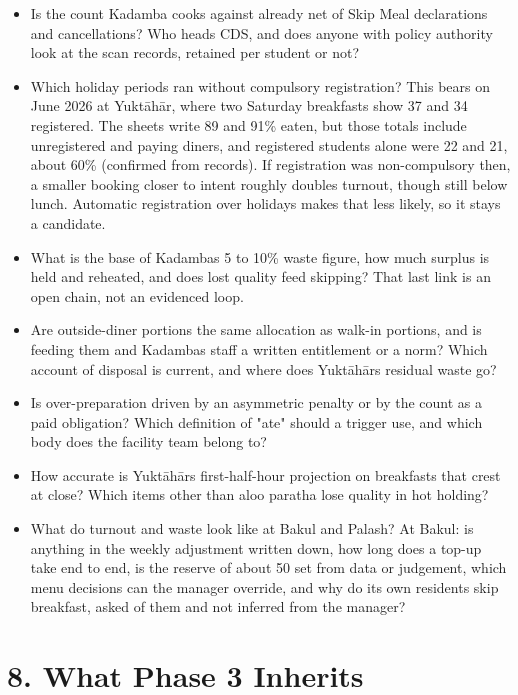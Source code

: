 \documentclass[
  10pt,
  table]{article}
\providecommand{\tightlist}{%
  \setlength{\itemsep}{0pt}\setlength{\parskip}{0pt}}
\renewcommand{\tightlist}{\setlength{\itemsep}{1.5pt}\setlength{\parskip}{0pt}}
\begin{document}
\begin{itemize}
\tightlist
\item
  Is the count Kadamba cooks against already net of Skip Meal declarations and cancellations? Who heads CDS, and does anyone with policy authority look at the scan records, retained per student or not?
\item
  Which holiday periods ran without compulsory registration? This bears on June 2026 at Yuktāhār, where two Saturday breakfasts show 37 and 34 registered. The sheets write 89 and 91\% eaten, but those totals include unregistered and paying diners, and registered students alone were 22 and 21, about 60\% (confirmed from records). If registration was non-compulsory then, a smaller booking closer to intent roughly doubles turnout, though still below lunch. Automatic registration over holidays makes that less likely, so it stays a candidate.
\item
  What is the base of Kadamba\textquotesingle s 5 to 10\% waste figure, how much surplus is held and reheated, and does lost quality feed skipping? That last link is an open chain, not an evidenced loop.
\item
  Are outside-diner portions the same allocation as walk-in portions, and is feeding them and Kadamba\textquotesingle s staff a written entitlement or a norm? Which account of disposal is current, and where does Yuktāhār\textquotesingle s residual waste go?
\item
  Is over-preparation driven by an asymmetric penalty or by the count as a paid obligation? Which definition of "ate" should a trigger use, and which body does the facility team belong to?
\item
  How accurate is Yuktāhār\textquotesingle s first-half-hour projection on breakfasts that crest at close? Which items other than aloo paratha lose quality in hot holding?
\item
  What do turnout and waste look like at Bakul and Palash? At Bakul: is anything in the weekly adjustment written down, how long does a top-up take end to end, is the reserve of about 50 set from data or judgement, which menu decisions can the manager override, and why do its own residents skip breakfast, asked of them and not inferred from the manager?
\end{itemize}

\section{8. What Phase 3 Inherits}\label{what-phase-3-inherits}
\end{document}
